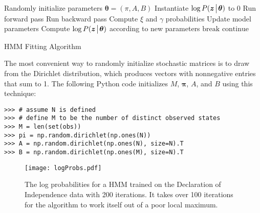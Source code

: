 \begin{algorithm}
\begin{algorithmic}[1]
    \State \textrm{Randomly initialize parameters $\boldsymbol\theta = (\pi, A, B)$} 
    \State \textrm{Instantiate} $\log P(\boldsymbol z \!\mathrel{\big|}\! \boldsymbol\theta)$ \textrm{to 0}
        \State \textrm{Run forward pass}
        \State \textrm{Run backward pass}
        \State \textrm{Compute $\xi$ and $\gamma$ probabilities} 
        \State \textrm{Update model parameters}
        \State \textrm{Compute $\log P(\boldsymbol z \!\mathrel{\big|}\! \boldsymbol\theta)$ according to new parameters}
        	   \State $\text{break}$ 
	\Else
	   \State $\text{continue}$
        \EndIf
    \EndFor
\EndProcedure
\end{algorithmic}
\caption{HMM Fitting Algorithm}
\label{alg:hmm3}
\end{algorithm}

The most convenient way to randomly initialize stochastic matrices is to draw from the Dirichlet distribution,
which produces vectors with nonnegative entries that sum to 1.
The following Python code initializes $M$, $\boldsymbol\pi$, $A$, and $B$ using this technique:
\begin{lstlisting}
>>> # assume N is defined
>>> # define M to be the number of distinct observed states
>>> M = len(set(obs))
>>> pi = np.random.dirichlet(np.ones(N))
>>> A = np.random.dirichlet(np.ones(N), size=N).T
>>> B = np.random.dirichlet(np.ones(M), size=N).T
\end{lstlisting}

\begin{figure}
\centering
\texttt{[image: logProbs.pdf]}
\caption{The log probabilities for a HMM trained on the Declaration of Independence
data with 200 iterations. It takes over 100 iterations for the algorithm to work itself out
of a poor local maximum.}
\label{fig:hmm-logprobs}
\end{figure}


